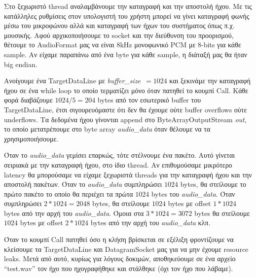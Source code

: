 \documentclass{article}
\begin{document}
Στο ξεχωριστό thread αναλαμβάνουμε την καταγραφή και την αποστολή ήχου. Με τις κατάλληλες ρυθμίσεις
στον υπολογιστή του χρήστη μπορεί να γίνει καταγραφή φωνής μέσω του μικροφώνου αλλά και καταγραφή των
ήχων του συστήματος όπως π.χ. μουσικής. Αφού αρχικοποιήσουμε το socket και την διεύθυνση του προορισμού,
θέτουμε το AudioFormat μας να είναι 8kHz μονοφωνικό PCM με 8-bits για κάθε sample. Αν είχαμε παραπάνω από 
ένα byte για κάθε sample, η διάταξή μας θα ήταν big endian. 

Ανοίγουμε ένα TargetDataLine με \mbox{\textit{buffer\_size} $= 1024$} και ξεκινάμε την καταγραφή ήχου
σε ένα while loop το οποίο τερματίζει μόνο όταν πατηθεί το κουμπί Call.
Κάθε φορά διαβάζουμε $1024/5 = 204$ bytes από τον εσωτερικό buffer του TargetDataLine, έτσι σιγουρευόμαστε
ότι δεν θα έχουμε ούτε buffer overflows ούτε underflows. Τα δεδομένα ήχου γίνονται append στο 
ByteArrayOutputStream \textit{out}, το οποίο μετατρέπουμε στο byte array \textit{audio\_data} όταν
θέλουμε να τα χρησιμοποιήσουμε.

Όταν το \textit{audio\_data} γεμίσει επαρκώς, τότε στέλνουμε ένα πακέτο. Αυτό γίνεται σειριακά με την
καταγραφή ήχου, στο ίδιο thread. Αν επιθυμούσαμε μικρότερο latency θα μπορούσαμε να είχαμε ξεχωριστά 
threads για την καταγραφή ήχου και την αποστολή πακέτων. Όταν το \textit{audio\_data}
συμπληρώσει $1024$ bytes, θα στείλουμε το πρώτο πακέτο το οποίο θα περιέχει τα πρώτα $1024$ bytes
του \textit{audio\_data}. Όταν συμπληρώσει $2*1024 = 2048$ bytes, θα στείλουμε $1024$ bytes με
offset $1*1024$ bytes από την αρχή του \textit{audio\_data}. Όμοια στα  $3*1024 = 3072$ bytes
θα στείλουμε $1024$ bytes με offset $2*1024$ bytes από την αρχή του \textit{audio\_data} κλπ.

Όταν το κουμπί Call πατηθεί όσο η κλήση βρίσκεται σε εξέλιξη φροντίζουμε να κλείσουμε τα TargetDataLine
και DatagramSocket μας για να μην έχουμε resource leaks. Μετά από αυτό, κυρίως για λόγους δοκιμών, 
αποθηκεύουμε σε ένα αρχείο ``test.wav'' τον ήχο που ηχογραφήθηκε και στάλθηκε (όχι τον ήχο που λάβαμε).
\end{document}
